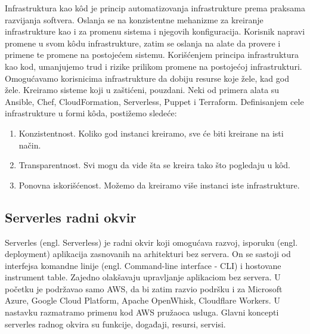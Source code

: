 \documentclass[12pt,oneside]{memoir}
\begin{document}
Infrastruktura kao kôd je princip automatizovanja infrastrukture prema praksama razvijanja softvera\cite{iac}. Oslanja se na konzistentne mehanizme za kreiranje infrastrukture kao i za promenu sistema i njegovih konfiguracija. Korisnik napravi promene u svom kôdu infrastrukture, zatim se oslanja na alate da provere i primene te promene na postojećem sistemu. Korišćenjem principa infrastruktura kao kod, umanjujemo trud i rizike prilikom promene na postojećoj infrastrukturi. Omogućavamo korisnicima infrastrukture da dobiju resurse koje žele, kad god žele. Kreiramo sisteme koji u zaštićeni, pouzdani. Neki od primera alata su Ansible, Chef, CloudFormation, Serverless, Puppet i Terraform. Definisanjem cele infrastrukture u formi kôda, postižemo sledeće\cite{iac}:
\begin{enumerate}
  \item Konzistentnost. Koliko god instanci kreiramo, sve će biti kreirane na isti način.
  \item Transparentnost. Svi mogu da vide šta se kreira tako što pogledaju u kôd.
  \item Ponovna iskorišćenost. Možemo da kreiramo više instanci iste infrastrukture.
\end{enumerate}
 
\subsection{Serverles radni okvir}
 
Serverles (engl. Serverless) je radni okvir koji omogućava razvoj, isporuku (engl. deployment) aplikacija zasnovanih na arhitekturi bez servera. On se sastoji od interfejsa komandne linije (engl. Command-line interface - CLI) i hostovane instrument table. Zajedno olakšavaju upravljanje aplikaciom bez servera. U početku je podržavao samo AWS, da bi zatim razvio podršku i za Microsoft Azure, Google Cloud Platform, Apache OpenWhisk, Cloudflare Workers. U nastavku razmatramo primenu kod AWS pružaoca usluga. Glavni koncepti serverles radnog okvira su funkcije, događaji, resursi, servisi. 
 
\end{document}
